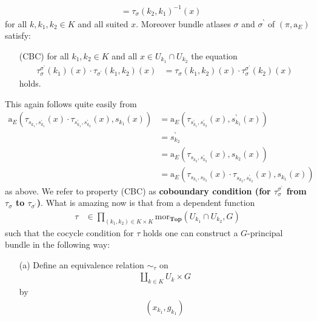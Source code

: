 \begin{exa}[Bundles 2]
\begin{align*}
  &=
  \tau_{\sigma}(k_{2},k_{1})^{-1}(x)
\end{align*}
for all $k,k_{1},k_{2} \in K$ and all suited $x$. Moreover bundle atlases $\sigma$ and $\sigma^{\backprime}$ of $(\pi,\mathrm{a}_{E})$ satisfy:
\begin{enumerate}
\item[(CBC)]
for all $k_{1},k_{2} \in K$ and all $x \in U_{k_{1}} \cap U_{k_{2}}$ the equation
\begin{align*}
  \tau_{\sigma}^{\sigma^{\backprime}}(k_{1})(x)
  \cdot
  \tau_{\sigma^{\backprime}}(k_{1},k_{2})(x)
  &=
  \tau_{\sigma}(k_{1},k_{2})(x)
  \cdot
  \tau_{\sigma}^{\sigma^{\backprime}}(k_{2})(x)
\end{align*}
holds.
\end{enumerate}
This again follows quite easily from
\begin{align*}
  \mathrm{a}_{E}
  \left(
    \tau_{s_{k_{1}},s_{k_{1}}^{\backprime}}(x)
    \cdot
    \tau_{s_{k_{1}}^{\backprime},s_{k_{2}}^{\backprime}}(x),
    s_{k_{1}}(x)
  \right)
  &=
  \mathrm{a}_{E}
  \left(
    \tau_{s_{k_{1}}^{\backprime},s_{k_{2}}^{\backprime}}(x),
    s_{k_{1}}^{\backprime}(x)
  \right)
  \\
  &=
  s_{k_{2}}^{\backprime}
  \\
  &=
  \mathrm{a}_{E}
  \left(
    \tau_{s_{k_{2}},s_{k_{2}}^{\backprime}}(x),
    s_{k_{2}}(x)
  \right)
  \\
  &=
  \mathrm{a}_{E}
  \left(
    \tau_{s_{k_{1}},s_{k_{2}}}(x)
    \cdot
    \tau_{s_{k_{2}},s_{k_{2}}^{\backprime}}(x),
    s_{k_{1}}(x)
  \right)
\end{align*}
as above. We refer to property (CBC) as \textbf{coboundary condition (for $\tau_{\sigma}^{\sigma^{\backprime}}$ from $\tau_{\sigma}$ to $\tau_{\sigma^{\backprime}}$)}. What is amazing now is that from a dependent function
\begin{align*}
  \tau
  &\in
  \prod_{(k_{1},k_{2}) \in K \times K}
  \mathrm{mor}_{\mathbf{Top}}(U_{k_{1}} \cap U_{k_{2}},G)
\end{align*}
such that the cocycle condition for $\tau$ holds one can construct a $G$-principal bundle in the following way:
\begin{enumerate}
\item[(a)]
Define an equivalence relation $\sim_{\tau}$ on
\begin{align*}
  \coprod_{k \in K}
  U_{k}
  \times
  G
\end{align*}
by
\begin{align*}
  (x_{k_{1}},g_{k_{1}})

\end{align*}
\end{enumerate}
\end{exa}
